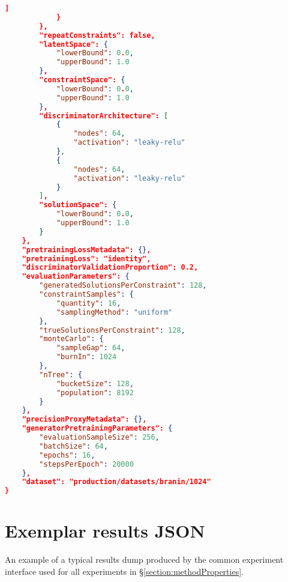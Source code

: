 \documentclass[../main.tex]{subfiles}
\begin{document}
\begin{lstlisting}[language=json,firstnumber=1,caption={Experimental parameters for training a generator on the bounded Branin function environment.},captionpos=b]
                ]
            }
        },
        "repeatConstraints": false,
        "latentSpace": {  
            "lowerBound": 0.0,
            "upperBound": 1.0
        },
        "constraintSpace": {  
            "lowerBound": 0.0,
            "upperBound": 1.0
        },
        "discriminatorArchitecture": [  
            {  
                "nodes": 64,
                "activation": "leaky-relu"
            },
            {  
                "nodes": 64,
                "activation": "leaky-relu"
            }
        ],
        "solutionSpace": {  
            "lowerBound": 0.0,
            "upperBound": 1.0
        }
    },
    "pretrainingLossMetadata": {},
    "pretrainingLoss": "identity",
    "discriminatorValidationProportion": 0.2,
    "evaluationParameters": {  
        "generatedSolutionsPerConstraint": 128,
        "constraintSamples": {  
            "quantity": 16,
            "samplingMethod": "uniform"
        },
        "trueSolutionsPerConstraint": 128,
        "monteCarlo": {  
            "sampleGap": 64,
            "burnIn": 1024
        },
        "nTree": {  
            "bucketSize": 128,
            "population": 8192
        }
    },
    "precisionProxyMetadata": {},
    "generatorPretrainingParameters": {  
        "evaluationSampleSize": 256,
        "batchSize": 64,
        "epochs": 16,
        "stepsPerEpoch": 20000
    },
    "dataset": "production/datasets/branin/1024"
}
\end{lstlisting}

\section{Exemplar results JSON} \label{appendix:exampleJSON}

An example of a typical results dump produced by the common experiment interface used for all experiments in \S\ref{section:methodProperties}.
\end{document}
